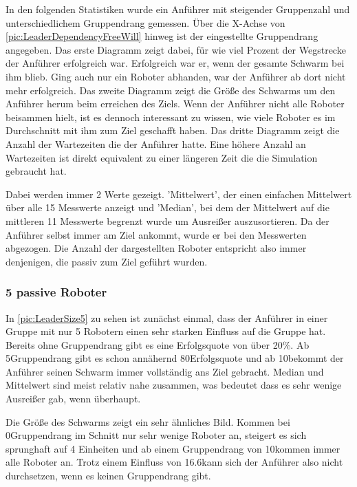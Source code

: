 In den folgenden Statistiken wurde ein Anführer mit steigender Gruppenzahl und unterschiedlichem Gruppendrang gemessen. Über die X-Achse von \autoref{pic:LeaderDependencyFreeWill} hinweg ist der eingestellte Gruppendrang angegeben.
Das erste Diagramm zeigt dabei, für wie viel Prozent der Wegstrecke der Anführer erfolgreich war. Erfolgreich war er, wenn der gesamte Schwarm bei ihm blieb. Ging auch nur ein Roboter abhanden, war der Anführer ab dort nicht mehr erfolgreich.
Das zweite Diagramm zeigt die Größe des Schwarms um den Anführer herum beim erreichen des Ziels. Wenn der Anführer nicht alle Roboter beisammen hielt, ist es dennoch interessant zu wissen, wie viele Roboter es im Durchschnitt mit ihm zum Ziel geschafft haben.
Das dritte Diagramm zeigt die Anzahl der Wartezeiten die der Anführer hatte. Eine höhere Anzahl an Wartezeiten ist direkt equivalent zu einer längeren Zeit die die Simulation gebraucht hat.

Dabei werden immer 2 Werte gezeigt. 'Mittelwert', der einen einfachen Mittelwert über alle 15 Messwerte anzeigt und 'Median', bei dem der Mittelwert auf die mittleren 11 Messwerte begrenzt wurde um Ausreißer auszusortieren. Da der Anführer selbst immer am Ziel ankommt, wurde er bei den Messwerten abgezogen. Die Anzahl der dargestellten Roboter entspricht also immer denjenigen, die passiv zum Ziel geführt wurden.

\subsubsection*{5 passive Roboter}


In \autoref{pic:LeaderSize5} zu sehen ist zunächst einmal, dass der Anführer in einer Gruppe mit nur 5 Robotern einen sehr starken Einfluss auf die Gruppe hat. Bereits ohne Gruppendrang gibt es eine Erfolgsquote von über 20\%. Ab 5\per Gruppendrang gibt es schon annähernd 80\per Erfolgsquote und ab 10\per bekommt der Anführer seinen Schwarm immer vollständig ans Ziel gebracht. Median und Mittelwert sind meist relativ nahe zusammen, was bedeutet dass es sehr wenige Ausreißer gab, wenn überhaupt.

Die Größe des Schwarms zeigt ein sehr ähnliches Bild. Kommen bei 0\per Gruppendrang im Schnitt nur sehr wenige Roboter an, steigert es sich sprunghaft auf 4 Einheiten und ab einem Gruppendrang von 10\per kommen immer alle Roboter an. Trotz einem Einfluss von 16.6\per kann sich der Anführer also nicht durchsetzen, wenn es keinen Gruppendrang gibt.

